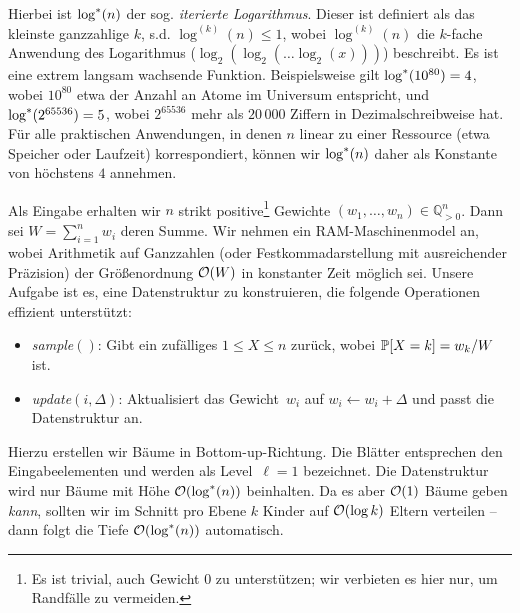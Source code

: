 Hierbei  ist $\log^*(n)$ der sog. \emph{iterierte Logarithmus}.
Dieser ist definiert als das kleinste ganzzahlige $k$, s.d. $\log^{(k)}(n) \le 1$, wobei $\log^{(k)}(n)$ die $k$-fache Anwendung des Logarithmus ($\log_2(\log_2(\ldots \log_2(x)))$) beschreibt.
Es ist eine extrem langsam wachsende Funktion.
Beispielsweise gilt $\log^*(10^{80}) = 4$, wobei $10^{80}$ etwa der Anzahl an Atome im Universum entspricht, und $\log^*({2^{65536}})=5$, wobei $2^{65536}$ mehr als $20\,000$ Ziffern in Dezimalschreibweise hat.
Für alle praktischen Anwendungen, in denen $n$ linear zu einer Ressource (etwa Speicher oder Laufzeit) korrespondiert, können wir $\log^*(n)$ daher als Konstante von höchstens $4$ annehmen.

\def\rng#1#2{\ensuremath{R^{\smash{\hspace{+1pt}(#1)}}_{\hspace{-1pt}#2}}}
\def\wght{\ensuremath{\operatorname{weight}}}
\def\wrng#1#2{\ensuremath{\wght\bigl(\rng{#1}{#2}\bigr)}}

\bigskip

Als Eingabe erhalten wir $n$ strikt positive\footnote{Es ist trivial, auch Gewicht $0$ zu unterstützen; wir verbieten es hier nur, um Randfälle zu vermeiden.} Gewichte $(w_1, \ldots, w_n) \in \mathbb Q_{>0}^n$.
Dann sei $W = \sum_{i=1}^n w_i$ deren Summe.
Wir nehmen ein RAM-Maschinenmodel an, wobei Arithmetik auf Ganzzahlen (oder Festkommadarstellung mit ausreichender Präzision) der Größenordnung $\mathcal{O}\!\left(W\right)$ in konstanter Zeit möglich sei.
Unsere Aufgabe ist es, eine Datenstruktur zu konstruieren, die folgende Operationen effizient unterstützt:
\begin{itemize}
    \item \emph{sample$()$}: Gibt ein zufälliges $1 \le X \le n$ zurück, wobei $\mathbb{P}\!\left[X = k\right] = w_k / W$ ist.
    \item \emph{update$(i, \Delta)$}: Aktualisiert das Gewicht~$w_i$ auf $w_i \gets w_i + \Delta$ und passt die Datenstruktur an.
\end{itemize}

Hierzu erstellen wir Bäume in Bottom-up-Richtung.
Die Blätter entsprechen den Eingabeelementen und werden als Level~$\ell = 1$ bezeichnet.
Die Datenstruktur wird nur Bäume mit Höhe $\mathcal{O}\!\left(\log^*(n)\right)$ beinhalten.
Da es aber $\mathcal{O}\!\left(1\right)$ Bäume geben \emph{kann}, sollten wir im Schnitt pro Ebene $k$ Kinder auf $\mathcal{O}\!\left(\log k\right)$ Eltern verteilen -- dann folgt die Tiefe $\mathcal{O}\!\left(\log^*(n)\right)$ automatisch.

